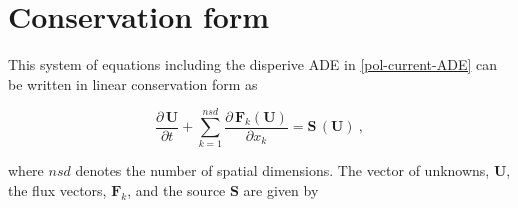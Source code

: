  
\section{Conservation form}

This system of equations including the disperive ADE in \eqref{pol-current-ADE} can be written in linear conservation form as

\begin{equation}
\frac{\partial \, \mathbf{U}}{\partial t} + \sum_{k=1}^{nsd} \frac { \partial \, \mathbf{F}_k(\mathbf{U}) }{ \partial x_k } = \mathbf{S}\,(\mathbf{U}) \: ,
\label{maxwell-curl-equations-conservation-form}
\end{equation}

where $nsd$ denotes the number of spatial dimensions. The vector of unknowns, $\mathbf{U}$, the flux vectors, $\mathbf{F}_k$, and the source $\mathbf{S}$ are given by


